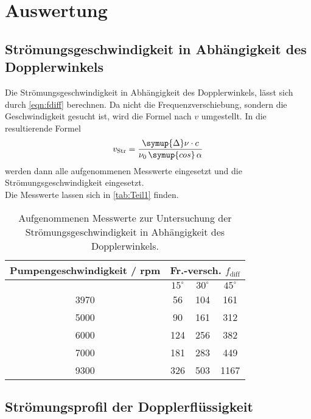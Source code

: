\section{Auswertung}
\label{sec:Auswertung}

\subsection{Strömungsgeschwindigkeit in Abhängigkeit des Dopplerwinkels}

Die Strömungsgeschwindigkeit in Abhängigkeit des Dopplerwinkels, lässt sich durch \autoref{eqn:fdiff}
berechnen. Da nicht die Frequenzverschiebung, sondern die Geschwindigkeit gesucht ist, wird die Formel
nach $v$ umgestellt. In die resultierende Formel
\begin{equation*}
  v_{\mathrm{Str}} = \frac{\symup{\Delta}\nu\cdot c}{\nu_0\,\symup{cos}\,\alpha} 
\end{equation*}
werden dann alle aufgenommenen Messwerte eingesetzt und die Strömungsgeschwindigkeit eingesetzt.\\
Die Messwerte lassen sich in \autoref{tab:Teil1} finden.\\
\begin{table}
  \centering
  \begin{tabular}{c | c | c | c}
    \toprule
    Pumpengeschwindigkeit / rpm & \multicolumn{3}{c}{Fr.-versch. $f_{\mathrm{diff}}$} \\
    \hline
     & $15^\circ$ & $30^\circ$ & $45^\circ$ \\
    \midrule
    3970     &       56     &     104     &    161 \\
    5000     &       90     &     161     &    312 \\
    6000     &       124    &     256     &    382\\
    7000     &       181    &     283     &    449\\
    9300     &       326    &     503    &    1167\\
    \bottomrule
  \end{tabular}
  \caption{Aufgenommenen Messwerte zur Untersuchung der Strömungsgeschwindigkeit in Abhängigkeit des Dopplerwinkels.}
  \label{tab:Teil1}
\end{table}




\subsection{Strömungsprofil der Dopplerflüssigkeit}

